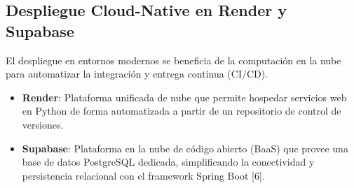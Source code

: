 \subsection{Despliegue Cloud-Native en Render y Supabase}
El despliegue en entornos modernos se beneficia de la computación en la nube para automatizar la integración y entrega continua (CI/CD).
\begin{itemize}
    \item \textbf{Render}: Plataforma unificada de nube que permite hospedar servicios web en Python de forma automatizada a partir de un repositorio de control de versiones.
    \item \textbf{Supabase}: Plataforma en la nube de código abierto (BaaS) que provee una base de datos PostgreSQL dedicada, simplificando la conectividad y persistencia relacional con el framework Spring Boot [6].
\end{itemize}
